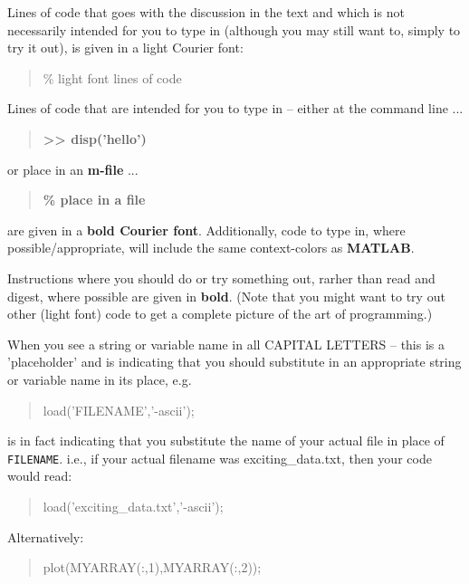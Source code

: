 \documentclass{tufte-book} %
\newenvironment{docspec}{\begin{quotation}\ttfamily\parskip0pt\parindent0pt\ignorespaces}{\end{quotation}}
\newenvironment{docspecbold}{\begin{quotation}\ttfamily\bfseries\parskip0pt\parindent0pt\ignorespaces}{\end{quotation}}
\begin{document}
\noindent Lines of code that goes with the discussion in the text and which is not necessarily intended for you to type in (although you may still want to, simply to try it out), is given in a light Courier font:

\begin{docspec}
\% light font lines of code
\end{docspec} 

Lines of code that are intended for you to type in -- either at the command line ...

\begin{docspecbold}
>> disp(\textcolor[rgb]{1,0,1}{'hello'})
\end{docspecbold}

\noindent or place in an \textbf{m-file} ...

\begin{docspecbold}
\textcolor[rgb]{0,0.501961,0}{\% place in a file}
\end{docspecbold} 

\noindent are given in a \textbf{bold Courier font}. Additionally, code to type in, where possible/appropriate, will include the same context-colors as \textbf{MATLAB}.

Instructions where you should do or try something out, rarher than read and digest, where possible are given in \textbf{bold}. (Note that you might want to try out other (light font) code to get a complete picture of the art of programming.)

\vspace{2mm}

When you see a string or variable name in all CAPITAL LETTERS -- this is a 'placeholder' and is indicating that you should substitute in an appropriate string or variable name in its place, e.g. 

\begin{docspec}
load('FILENAME','-ascii');
\end{docspec}  

\noindent is in fact indicating that you substitute the name of your actual file in place of \texttt{FILENAME}. i.e., if your actual filename was \textsf{exciting\_data.txt}, then your code would read:

\begin{docspec}
load('exciting\_data.txt','-ascii');
\end{docspec}  

Alternatively:

\begin{docspec}
plot(MYARRAY(:,1),MYARRAY(:,2));
\end{docspec}
\end{document}
